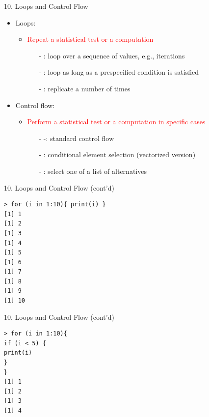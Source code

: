 \documentclass[14pt, aspectratio=169, sectionpage=simple, xclolor=table]{beamer}
\begin{document}
\begin{frame}{10. Loops and Control Flow}
\begin{itemize}
	\item Loops:
	\begin{itemize}
		\item \textcolor{red}{Repeat a statistical test or a computation}
		\begin{itemize}
			\item[-] : loop over a sequence of values, e.g., iterations
			\item[-] : loop as long as a prespecified condition is satisfied
			\item[-] : replicate a number of times
		\end{itemize}
	\end{itemize}
	\item Control flow:
	\begin{itemize}
		\item \textcolor{red}{Perform a statistical test or a computation in specific cases}
		\begin{itemize}
			\item[-] -: standard control flow
			\item[-] : conditional element selection (vectorized version)
			\item[-] : select one of a list of alternatives
		\end{itemize}
	\end{itemize}
\end{itemize}
\end{frame}
\begin{frame}[fragile]{10. Loops and Control Flow (cont'd)}
\vspace*{-5mm}
{\small
\begin{verbatim}
> for (i in 1:10){ print(i) }
[1] 1
[1] 2
[1] 3
[1] 4
[1] 5
[1] 6
[1] 7
[1] 8
[1] 9
[1] 10
\end{verbatim}
}
\end{frame}
\begin{frame}[fragile]{10. Loops and Control Flow (cont'd)}
\begin{verbatim}
> for (i in 1:10){
if (i < 5) {
print(i)
}
}
[1] 1
[1] 2
[1] 3
[1] 4
\end{verbatim}


\end{frame}
\end{document}

